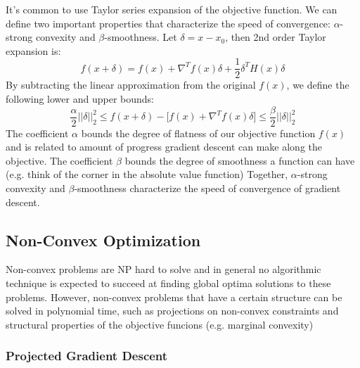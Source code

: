 It's common to use Taylor series expansion of the objective function. We can define two important properties that characterize the speed of convergence: $\alpha$-strong convexity and $\beta$-smoothness. Let $\delta = x - x_0$, then 2nd order Taylor expansion is:
\begin{equation}
    f(x + \delta) = f(x) + \nabla^{T}f(x)\delta + \frac{1}{2}\delta^{T}H(x)\delta
\end{equation}
By subtracting the linear approximation from the original $f(x)$, we define the following lower and upper bounds:
\begin{equation}
    \frac{\alpha}{2}||\delta||_{2}^{2} \leq f(x+ \delta) - \bigg[f(x) + \nabla^{T}f(x)\delta \bigg] \leq \frac{\beta}{2}||\delta||_{2}^{2}
\end{equation}
The coefficient $\alpha$ bounds the degree of flatness of our objective function $f(x)$ and is related to amount of progress gradient descent can make along the objective. The coefficient $\beta$ bounds the degree of smoothness a function can have (e.g. think of the corner in the absolute value function) 
Together, $\alpha$-strong convexity and $\beta$-smoothness characterize the speed of convergence of gradient descent.


\subsection{Non-Convex Optimization}

Non-convex problems are NP hard to solve and in general no algorithmic technique is expected to succeed at finding global optima solutions to these problems. However, non-convex problems that have a certain structure can be solved in polynomial time, such as projections on non-convex constraints and structural properties of the objective funcions (e.g. marginal convexity) \cite{NonConvexML}

\subsubsection{Projected Gradient Descent}

